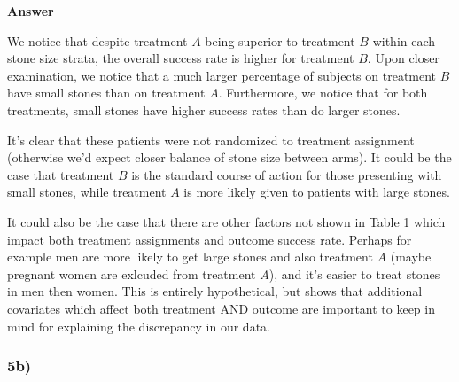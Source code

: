 \documentclass[
  11pt,
  letterpaper,
  DIV=11,
  numbers=noendperiod]{scrartcl}
\begin{document}
\begin{tcolorbox}[enhanced jigsaw, arc=.35mm, colback=white, bottomrule=.15mm, breakable, opacityback=0, rightrule=.15mm, toprule=.15mm, leftrule=.75mm, left=2mm, colframe=quarto-callout-note-color-frame]

\textbf{Answer}\vspace{2mm}

We notice that despite treatment \(A\) being superior to treatment \(B\)
within each stone size strata, the overall success rate is higher for
treatment \(B\). Upon closer examination, we notice that a much larger
percentage of subjects on treatment \(B\) have small stones than on
treatment \(A\). Furthermore, we notice that for both treatments, small
stones have higher success rates than do larger stones.

It's clear that these patients were not randomized to treatment
assignment (otherwise we'd expect closer balance of stone size between
arms). It could be the case that treatment \(B\) is the standard course
of action for those presenting with small stones, while treatment \(A\)
is more likely given to patients with large stones.

It could also be the case that there are other factors not shown in
Table 1 which impact both treatment assignments and outcome success
rate. Perhaps for example men are more likely to get large stones and
also treatment \(A\) (maybe pregnant women are exlcuded from treatment
\(A\)), and it's easier to treat stones in men then women. This is
entirely hypothetical, but shows that additional covariates which affect
both treatment AND outcome are important to keep in mind for explaining
the discrepancy in our data.

\end{tcolorbox}

\hypertarget{b-1}{%
\subsubsection{5b)}\label{b-1}}
\end{document}
